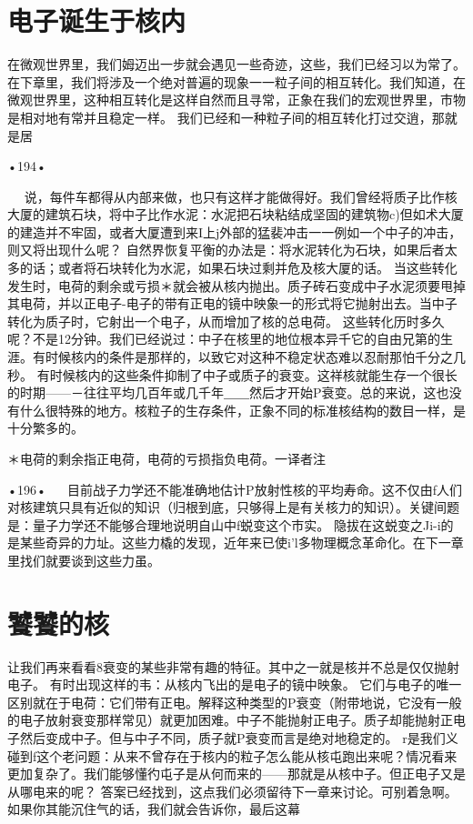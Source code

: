 {{\section{电子诞生于核内}

在微观世界里，我们姆迈出一步就会遇见一些奇迹，这些，我们已经习以为常了。在下章里，我们将涉及一个绝对普遍的现象一一粒子间的相互转化。我们知道，在微观世界里，这种相互转化是这样自然而且寻常，正象在我们的宏观世界里，市物是相对地有常并且稳定一样。
我们已经和一种粒子间的相互转化打过交逍，那就是居

•194•
  



  
说，每件车都得从内部来做，也只有这样才能做得好。我们曾经将质子比作核大厦的建筑石块，将中子比作水泥：水泥把石块粘结成坚固的建筑物c)但如术大厦的建造并不牢固，或者大厦遭到来I上j外部的猛裴冲击一一例如一个中子的冲击，则又将出现什么呢？
自然界恢复平衡的办法是：将水泥转化为石块，如果后者太多的话；或者将石块转化为水泥，如果石块过剩并危及核大厦的话。
当这些转化发生时，电荷的剩余或亏损＊就会被从核内抛出。质子砖石变成中子水泥须要甩掉其电荷，并以正电子-电子的带有正电的镜中映象一的形式将它抛射出去。当中子转化为质子时，它射出一个电子，从而增加了核的总电荷。
这些转化历时多久呢？不是12分钟。我们已经说过：中子在核里的地位根本异千它的自由兄第的生涯。有时候核内的条件是那样的，以致它对这种不稳定状态难以忍耐那怕千分之几秒。
有时候核内的这些条件抑制了中子或质子的衰变。这祥核就能生存一个很长的时期——－往往平均几百年或几千年＿＿然后才开始P衰变。总的来说，这也没有什么很特殊的地方。核粒子的生存条件，正象不同的标准核结构的数目一样，是十分繁多的。

＊电荷的剩余指正电荷，电荷的亏损指负电荷。一译者注

•196•
  
目前战子力学还不能准确地估计P放射性核的平均寿命。这不仅由f人们对核建筑只具有近似的知识（归根到底，只够得上是有关核力的知识）。关键间题是：量子力学还不能够合理地说明自山中f蜕变这个市实。
隐拔在这蜕变之Ji-i的是某些奇异的力址。这些力橇的发现，近年来已使i'l多物理概念革命化。在下一章里找们就要谈到这些力虽。

\section{饕饕的核}

让我们再来看看8衰变的某些非常有趣的特征。其中之一就是核并不总是仅仅抛射电子。
有时出现这样的韦：从核内飞出的是电子的镜中映象。
它们与电子的唯一区别就在于电荷：它们带有正电。解释这种类型的P衰变（附带地说，它没有一般的电子放射衰变那样常见）就更加困难。中子不能抛射正电子。质子却能抛射正电子然后变成中子。但与中子不同，质子就P衰变而言是绝对地稳定的。
r是我们义碰到f这个老问题：从来不曾存在于核内的粒子怎么能从核屯跑出来呢？情况看来更加复杂了。我们能够懂彴屯子是从何而来的——那就是从核中子。但正电子又是从哪电来的呢？
答案已经找到，这点我们必须留待下一章来讨论。可别着急啊。如果你其能沉住气的话，我们就会告诉你，最后这幕

}}
